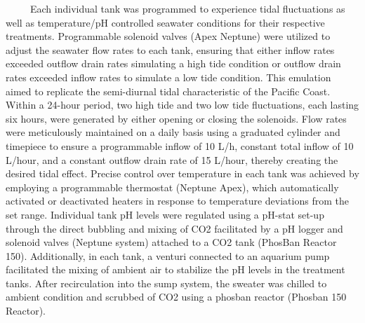 \documentclass[
  12pt,
]{article}
\begin{document}
~~~~~Each individual tank was programmed to experience tidal
fluctuations as well as temperature/pH controlled seawater conditions
for their respective treatments. Programmable solenoid valves (Apex
Neptune) were utilized to adjust the seawater flow rates to each tank,
ensuring that either inflow rates exceeded outflow drain rates
simulating a high tide condition or outflow drain rates exceeded inflow
rates to simulate a low tide condition. This emulation aimed to
replicate the semi-diurnal tidal characteristic of the Pacific Coast.
Within a 24-hour period, two high tide and two low tide fluctuations,
each lasting six hours, were generated by either opening or closing the
solenoids. Flow rates were meticulously maintained on a daily basis
using a graduated cylinder and timepiece to ensure a programmable inflow
of 10 L/h, constant total inflow of 10 L/hour, and a constant outflow
drain rate of 15 L/hour, thereby creating the desired tidal effect.
Precise control over temperature in each tank was achieved by employing
a programmable thermostat (Neptune Apex), which automatically activated
or deactivated heaters in response to temperature deviations from the
set range. Individual tank pH levels were regulated using a pH-stat
set-up through the direct bubbling and mixing of CO2 facilitated by a pH
logger and solenoid valves (Neptune system) attached to a CO2 tank
(PhosBan Reactor 150). Additionally, in each tank, a venturi connected
to an aquarium pump facilitated the mixing of ambient air to stabilize
the pH levels in the treatment tanks. After recirculation into the sump
system, the sweater was chilled to ambient condition and scrubbed of CO2
using a phosban reactor (Phosban 150 Reactor).
\end{document}
